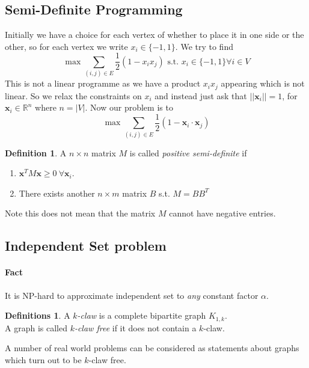 \documentclass{article}
\theoremstyle{definition}
\newtheorem*{defn}{Definition}
\newtheorem*{defns}{Definitions}
\newcommand{\RR}{\mathbb{R}}
\newcommand{\x}{\mathbf{x}}
\begin{document}
\subsection{Semi-Definite Programming}

Initially we have a choice for each vertex of whether to place it in one side or the other, so for each vertex we write $x_i\in\{-1,1\}$.
We try to find
$$\max \sum_{(i,j)\in E} \frac{1}{2}(1-x_ix_j) \text{ s.t. } x_i\in \{-1,1\} \forall i\in V$$
This is not a linear programme as we have a product $x_ix_j$ appearing which is not linear.
So we relax the constraints on $x_i$ and instead just ask that $||\x_i|| = 1$, for $\x_i\in\RR^n$ where $n = |V|$.
Now our problem is to
$$\max \sum_{(i,j)\in E} \frac{1}{2}(1-\x_i\cdot \x_j)$$

\begin{defn}
A $n\times n$ matrix $M$ is called \emph{positive semi-definite} if
\begin{enumerate}
\item $\x^TM\x \ge 0\ \forall \x_i$.
\item There exists another $n\times m$ matrix $B$ s.t. $M=BB^T$
\end{enumerate}
\end{defn}

Note this does not mean that the matrix $M$ cannot have negative entries.



\subsection{Independent Set problem}

\paragraph{Fact}
It is NP-hard to approximate independent set to \emph{any} constant factor $\alpha$.

\begin{defns}
A \emph{$k$-claw} is a complete bipartite graph $K_{1,k}$. \\
A graph is called \emph{$k$-claw free} if it does not contain a $k$-claw.
\end{defns}

A number of real world problems can be considered as statements about graphs which turn out to be $k$-claw free.
\end{document}
